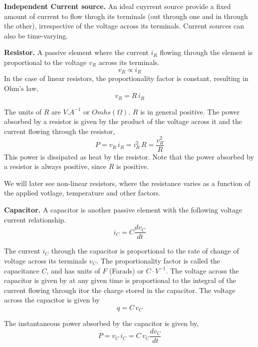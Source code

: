 \noindent \textbf{Independent Current source.} An ideal cuyrrent source provide a fixed amount of current to flow throgh its terminals (out through one and in through the other), irrespective of the voltage across its terminals. Current sources can also be time-varying.

\noindent \textbf{Resistor.} A passive element where the current $i_R$ flowing through the element is proportional to the voltage $v_R$ across its terminals.
\[ v_R \propto i_R \]
In the case of linear resistors, the proportionality factor is constant, resulting in Ohm's law,
\begin{equation}
    v_R = R \, i_R
    \label{eq:ch02-01}
\end{equation}

The units of $R$ are $V.A^{-1}$ or $Omhs \left( \Omega \right)$. $R$ is in general positive. The power absorbed by a resistor is given by the product of the voltage across it and the current flowing through the resistor, 
\begin{equation}
    P = v_R \, i_R = i_R^2 \, R = \frac{v_R^2}{R}
    \label{eq:ch02-02}
\end{equation}
This power is dissipated as heat by the resistor. Note that the power absorbed by a resistor is always positive, since $R$ is positive.

We will later see non-linear resistors, where the resistance varies as a function of the applied votlage, temperature and other factors. 

\noindent \textbf{Capacitor.} A capacitor is another passive element with the following voltage current relationship.
\begin{equation}
    i_C = C \frac{d v_C}{dt}
    \label{eq:ch02-03}
\end{equation}

The current $i_C$ through the capacitor is proportional to the rate of change of voltage across its terminals $v_C$. The proportionality factor is called the capacitance $C$, and has units of $F$ (Farads) or $C \cdot V^{-1}$. The voltage across the capacitor is given by at any given time is proportional to the integral of the current flowing through itor the charge stored in the capacitor. The voltage across the capacitor is given by
\begin{equation}
    q = C \, v_C
    \label{eq:ch02-04}
\end{equation}

The instantaneous power absorbed by the capacitor is given by,
\begin{equation}
    P = v_C \, i_C = C \, v_C \frac{d v_C}{dt}
    \label{eq:ch02-05}
\end{equation}

